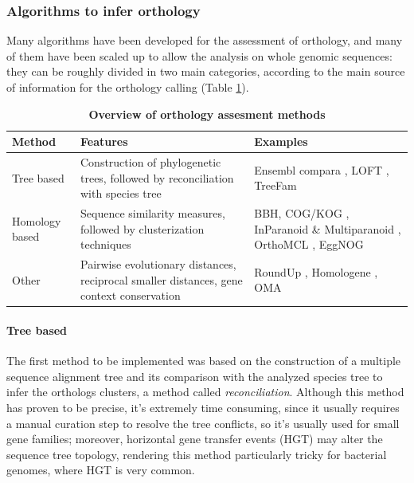 \subsubsection{Algorithms to infer orthology}
Many algorithms have been developed for the assessment of orthology, and many of them have been scaled up to allow the analysis on whole genomic sequences: they can be roughly divided in two main categories, according to the main source of information for the orthology calling (Table \ref{tab:orthologs}).

\begin{table}
    \begin{tabularx}{\textwidth}{|p{2.9cm}|p{5.3cm}|p{3.6cm}|}
        \hline
        \textbf{Method} & \textbf{Features} & \textbf{Examples} \\ \hline
        Tree based & Construction of phylogenetic trees, followed by reconciliation with species tree & Ensembl compara \cite{kersey2010ensembl}, LOFT \cite{van2007orthology}, TreeFam \cite{li2006treefam} \\ 
        Homology based & Sequence similarity measures, followed by clusterization techniques & BBH, COG/KOG \cite{tatusov1997genomic}\cite{tatusov2003cog}, InParanoid \cite{o2005inparanoid} \& Multiparanoid \cite{alexeyenko2006automatic}, OrthoMCL \cite{li2003orthomcl}, EggNOG \cite{jensen2008eggnog} \\ 
        Other & Pairwise evolutionary distances, reciprocal smaller distances, gene context conservation & RoundUp \cite{deluca2006roundup}, Homologene \cite{wheeler2007database}, OMA \cite{dessimoz2005oma} \\
        \hline
    \end{tabularx}
	\caption{\label{tab:orthologs}\textbf{Overview of orthology assesment methods}}
\end{table}

\paragraph{Tree based}
The first method to be implemented was based on the construction of a multiple sequence alignment tree and its comparison with the analyzed species tree to infer the orthologs clusters, a method called \textit{reconciliation}. Although this method has proven to be precise, it's extremely time consuming, since it usually requires a manual curation step to resolve the tree conflicts, so it's usually used for small gene families; moreover, horizontal gene transfer events (HGT) may alter the sequence tree topology, rendering this method particularly tricky for bacterial genomes, where HGT is very common.


